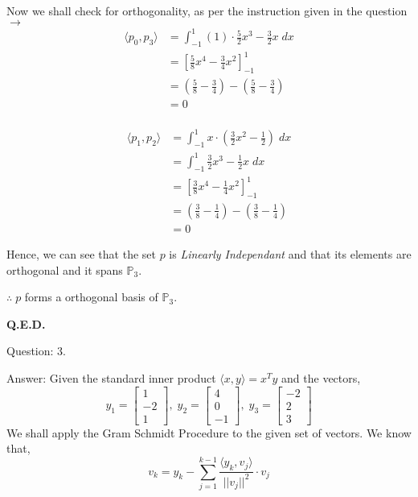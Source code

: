 \documentclass[a4paper]{article}
\begin{document}
\begin{qalist}
			Now we shall check for orthogonality, as per the instruction given in the question $\rightarrow$
			\begin{align}
				\langle {p}_{0}, {p}_{3} \rangle &= {\int}_{-1}^{1} (1)\cdot\frac{5}{2}{x}^{3} -\frac{3}{2}x\;dx \\
				&= \left[ \frac{5}{8}{x}^{4} - \frac{3}{4}{x}^{2}\right]_{-1}^{1} \\
				&= \left(\frac{5}{8} - \frac{3}{4} \right) - \left(\frac{5}{8} - \frac{3}{4} \right) \\
				& = 0
			\end{align}
			\\
			\begin{align}
				\langle {p}_{1}, {p}_{2} \rangle &= {\int}_{-1}^{1} x \cdot \left(\frac{3}{2}{x}^{2} - \frac{1}{2}\right) \; dx \\
				&= {\int}_{-1}^{1}\frac{3}{2}{x}^{3} - \frac{1}{2}x\; dx \\
				&= \left[ \frac{3}{8}{x}^{4} - \frac{1}{4}{x}^{2}\right]_{-1}^{1} \\
				&= \left(\frac{3}{8} - \frac{1}{4} \right) - \left(\frac{3}{8} - \frac{1}{4} \right) \\
				& = 0
			\end{align}
			
			Hence, we can see that the set $p$ is \textit{Linearly Independant} and that its elements are orthogonal and it spans ${\mathbb{P}}_{3}$. 
			
			$\therefore \; p$ forms a orthogonal basis of ${\mathbb{P}}_{3}$.
			
			\textbf{Q.E.D.}
			
		\item[Question: 3.] \setcounter{equation}{0}
		\item[Answer:] Given the standard inner product $\langle x,y \rangle = {x}^{T}y$ and the vectors, 
			\begin{equation}
				{y}_{1} = \begin{bmatrix}1 \\ -2 \\ 1\end{bmatrix},\; {y}_{2} = \begin{bmatrix}4 \\ 0 \\ -1\end{bmatrix},\;{y}_{3} = \begin{bmatrix}-2 \\ 2 \\ 3\end{bmatrix}
			\end{equation}	
			We shall apply the Gram Schmidt Procedure to the given set of vectors. We know that, 
			\begin{equation}
				{v}_{k} = {y}_{k} - \sum_{j = 1}^{k-1} \frac{\langle {y}_{k}, {v}_{j}\rangle}{{||{v}_{j}||}^{2}} \cdot {v}_{j}
			\end{equation}
			

\end{qalist}
\end{document}
